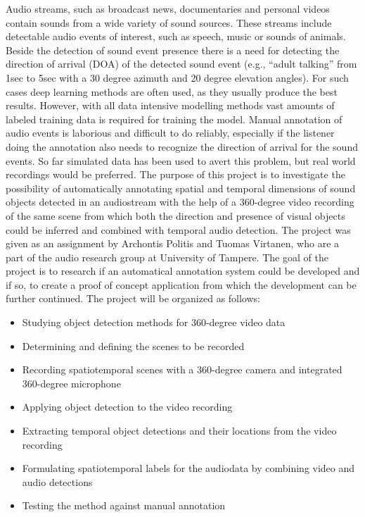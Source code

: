 Audio streams, such as broadcast news, documentaries and personal videos contain sounds from a wide variety of sound sources. These streams include detectable audio events of interest, such as speech, music or sounds of animals. Beside the detection of sound event presence there is a need for detecting the direction of arrival (DOA) of the detected sound event (e.g., “adult talking” from 1sec to 5sec with a 30 degree azimuth and 20 degree elevation angles). For such cases deep learning methods are often used, as they usually produce the best results. However, with all data intensive modelling methods vast amounts of labeled training data is required for training the model. Manual annotation of audio events is laborious and difficult to do reliably, especially if the listener doing the annotation also needs to recognize the direction of arrival for the sound events. So far simulated data has been used to avert this problem, but real world recordings would be preferred. The purpose of this project is to investigate the possibility of automatically annotating spatial and temporal dimensions of sound objects detected in an audiostream with the help of a 360-degree video recording of the same scene from which both the direction and presence of visual objects could be inferred and combined with temporal audio detection. The project was given as an assignment by Archontis Politis and Tuomas Virtanen, who are a part of the audio research group at University of Tampere. The goal of the project is to research if an automatical annotation system could be developed and if so, to create a proof of concept application from which the development can be further continued. The project will be organized as follows:

\begin{itemize}
	\item Studying object detection methods for 360-degree video data
	\item Determining and defining the scenes to be recorded
	\item Recording spatiotemporal scenes with a 360-degree camera and integrated 360-degree microphone
	\item Applying object detection to the video recording 
	\item Extracting temporal object detections and their locations from the video recording
	\item Formulating spatiotemporal labels for the audiodata by combining video and audio detections
	\item Testing the method against manual annotation
\end{itemize}